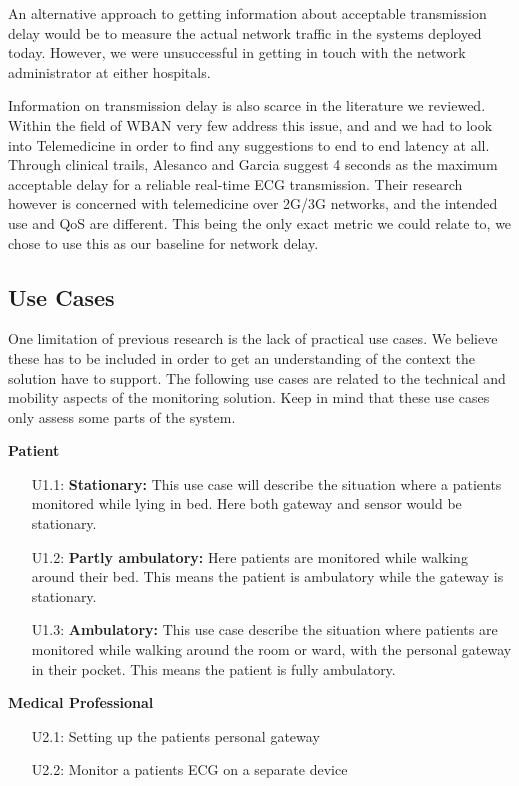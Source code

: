 An alternative approach to getting information about acceptable transmission delay would be to measure the actual network traffic in the systems deployed today. However, we were unsuccessful in getting in touch with the network administrator at either hospitals.

Information on transmission delay is also scarce in the literature we reviewed. Within the field of WBAN very few address this issue, and and we had to look into Telemedicine in order to find any suggestions to end to end latency at all. Through clinical trails, Alesanco and Garcia suggest 4 seconds as the maximum acceptable delay for a reliable real-time ECG transmission. Their research however is concerned with telemedicine over 2G/3G networks, and the intended use and QoS are different. This being the only exact metric we could relate to, we chose to use this as our baseline for network delay.



\subsection{Use Cases} %
\label{ssub:use_cases}

One limitation of previous research is the lack of practical use cases. We believe these has to be included in order to get an understanding of the context the solution have to support. The following use cases are related to the technical and mobility aspects of the monitoring solution. Keep in mind that these use cases only assess some parts of the system.

\newline
\noindent
\textbf{Patient}

\begin{enumerate}

  \item[\textsc{U1.1}:]\textbf{Stationary:} This use case will describe the situation where a patients monitored while lying in bed. Here both gateway and sensor would be stationary.

  \item[\textsc{U1.2}:]\textbf{Partly ambulatory:} Here patients are monitored while walking around their bed. This means the patient is ambulatory while the gateway is stationary.

  \item[\textsc{U1.3}:]\textbf{Ambulatory:} This use case describe the situation where patients are monitored while walking around the room or ward, with the personal gateway in their pocket. This means the patient is fully ambulatory.

\end{enumerate}

\newline
\noindent
\textbf{Medical Professional}
\begin{enumerate}

  \item[\textsc{U2.1}:] Setting up the patients personal gateway
  \item[\textsc{U2.2}:] Monitor a patients ECG on a separate device

\end{enumerate}

